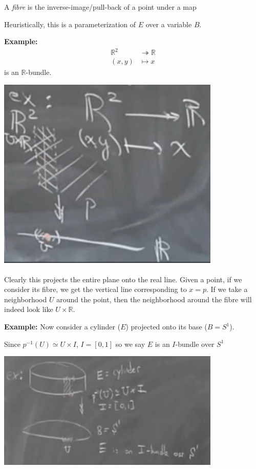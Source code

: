 \documentclass[12pt]{article}
\newcommand{\R}{\mathbb{R}}
\begin{document}
    A \emph{fibre} is the inverse-image/pull-back of a point under a map 

    Heuristically, this is a parameterization of $E$ over a variable $B$. 

    \textbf{Example:}
    \[\begin{aligned}
        \R^2 &\twoheadrightarrow \R\\ 
        (x, y) &\mapsto x
    \end{aligned}\]
    is an $\R$-bundle. 

    \begin{center}
        \includegraphics[width=0.8\textwidth]{Images/April 16 - R2 bundle.png}
    \end{center}

    Clearly this projects the entire plane onto the real line. Given a point, if we consider its fibre, we get the vertical line corresponding to $x = p$. If we take a neighborhood $U$ around the point, then the neighborhood around the fibre will indeed look like $U \times \R$. 

    \textbf{Example:} Now consider a cylinder ($E$) projected onto its base ($B = S^1$).
    
    Since $p^{-1}(U) \simeq U \times I$, $I = [0, 1]$ so we say $E$ is an $I$-bundle over $S^1$

    \begin{center}
        \includegraphics[width=0.8\textwidth]{Images/April 16 - Cylinder bundle.png}
    \end{center}
\end{document}
